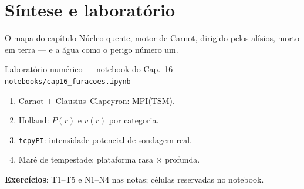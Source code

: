 \documentclass[aspectratio=169,11pt]{beamer}
\begin{document}
\section{Síntese e laboratório}

\begin{frame}{O mapa do capítulo}
  \vspace{0.6em}
  Núcleo quente, motor de Carnot, dirigido pelos alísios, morto em
  terra — e a água como o perigo número um.
\end{frame}

\begin{frame}{Laboratório numérico --- notebook do Cap.~16}
  \texttt{notebooks/cap16\_furacoes.ipynb}
  \begin{enumerate}
    \item Carnot $+$ Clausius--Clapeyron: MPI(TSM).
    \item Holland: $P(r)$ e $v(r)$ por categoria.
    \item \texttt{tcpyPI}: intensidade potencial de sondagem real.
    \item Maré de tempestade: plataforma rasa × profunda.
  \end{enumerate}
  \vspace{0.4em}
  \textbf{Exercícios}: T1--T5 e N1--N4 nas notas; células reservadas no
  notebook.
  \vfill
  \atribuicao
\end{frame}
\end{document}
